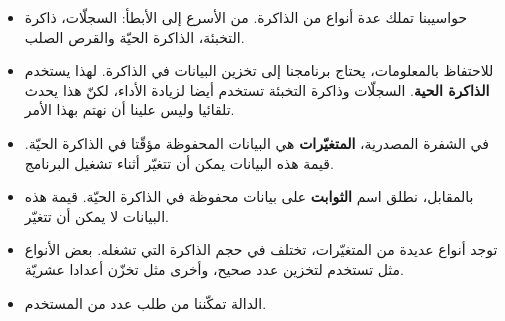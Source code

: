 \begin{itemize}
  \item حواسيبنا تملك عدة أنواع من الذاكرة. من الأسرع إلى الأبطأ: السجلّات، ذاكرة التخبئة، الذاكرة الحيّة والقرص الصلب.
  \item للاحتفاظ بالمعلومات، يحتاج برنامجنا إلى تخزين البيانات في الذاكرة. لهذا يستخدم
\textbf{الذاكرة الحية}.
السجلّات وذاكرة التخبئة تستخدم أيضا لزيادة الأداء، لكنّ هذا يحدث تلقائيا وليس علينا أن نهتم بهذا الأمر.
  \item في الشفرة المصدرية،
\textbf{المتغيّرات}
هي البيانات المحفوظة مؤقّتا في الذاكرة الحيّة. قيمة هذه البيانات يمكن أن تتغيّر أثناء تشغيل البرنامج.
  \item بالمقابل، نطلق اسم
\textbf{الثوابت}
على بيانات محفوظة في الذاكرة الحيّة. قيمة هذه البيانات لا يمكن أن تتغيّر.
  \item توجد أنواع عديدة من المتغيّرات، تختلف في حجم الذاكرة التي تشغله. بعض الأنواع مثل
تستخدم لتخزين عدد صحيح، وأخرى مثل
تخزّن أعدادا عشريّة.
  \item الدالة
 تمكّننا من طلب عدد من المستخدم.
\end{itemize}
